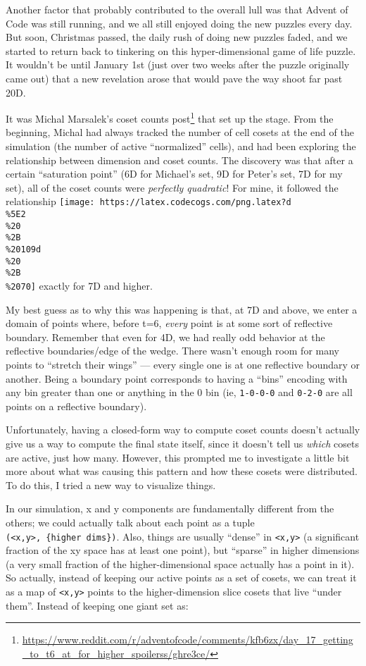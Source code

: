 \documentclass[]{article}
\renewcommand{\href}[2]{#2\footnote{\url{#1}}}
\begin{document}
Another factor that probably contributed to the overall lull was that Advent of
Code was still running, and we all still enjoyed doing the new puzzles every
day. But soon, Christmas passed, the daily rush of doing new puzzles faded, and
we started to return back to tinkering on this hyper-dimensional game of life
puzzle. It wouldn't be until January 1st (just over two weeks after the puzzle
originally came out) that a new revelation arose that would pave the way shoot
far past 20D.

It was
\href{https://www.reddit.com/r/adventofcode/comments/kfb6zx/day_17_getting_to_t6_at_for_higher_spoilerss/ghre3ce/}{Michal
Marsalek's coset counts post} that set up the stage. From the beginning, Michal
had always tracked the number of cell cosets at the end of the simulation (the
number of active ``normalized'' cells), and had been exploring the relationship
between dimension and coset counts. The discovery was that after a certain
``saturation point'' (6D for Michael's set, 9D for Peter's set, 7D for my set),
all of the coset counts were \emph{perfectly quadratic}! For mine, it followed
the relationship
\texttt{[image: https://latex.codecogs.com/png.latex?d\\\%5E2\\\%20\\\%2B\\\%20109d\\\%20\\\%2B\\\%2070]}
exactly for 7D and higher.

My best guess as to why this was happening is that, at 7D and above, we enter a
domain of points where, before t=6, \emph{every} point is at some sort of
reflective boundary. Remember that even for 4D, we had really odd behavior at
the reflective boundaries/edge of the wedge. There wasn't enough room for many
points to ``stretch their wings'' --- every single one is at one reflective
boundary or another. Being a boundary point corresponds to having a ``bins''
encoding with any bin greater than one or anything in the 0 bin (ie,
\texttt{1-0-0-0} and \texttt{0-2-0} are all points on a reflective boundary).

Unfortunately, having a closed-form way to compute coset counts doesn't actually
give us a way to compute the final state itself, since it doesn't tell us
\emph{which} cosets are active, just how many. However, this prompted me to
investigate a little bit more about what was causing this pattern and how these
cosets were distributed. To do this, I tried a new way to visualize things.

In our simulation, x and y components are fundamentally different from the
others; we could actually talk about each point as a tuple
\texttt{(\textless{}x,y\textgreater{},\ \{higher\ dims\})}. Also, things are
usually ``dense'' in \texttt{\textless{}x,y\textgreater{}} (a significant
fraction of the xy space has at least one point), but ``sparse'' in higher
dimensions (a very small fraction of the higher-dimensional space actually has a
point in it). So actually, instead of keeping our active points as a set of
cosets, we can treat it as a map of \texttt{\textless{}x,y\textgreater{}} points
to the higher-dimension slice cosets that live ``under them''. Instead of
keeping one giant set as:
\end{document}
